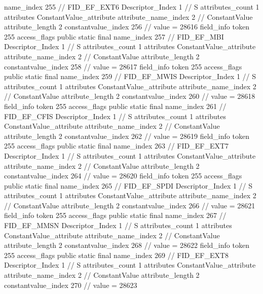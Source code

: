 {{{{{				name_index	255		// FID_EF_EXT6
				Descriptor_Index	1		// S
				attributes_count	1
				attributes {
				ConstantValue_attribute {
					attribute_name_index	2		// ConstantValue
					attribute_length	2
					constantvalue_index	256		// value = 28616
				}
				}
			}
			field_info {
				token	255
				access_flags	public static final
				name_index	257		// FID_EF_MBI
				Descriptor_Index	1		// S
				attributes_count	1
				attributes {
				ConstantValue_attribute {
					attribute_name_index	2		// ConstantValue
					attribute_length	2
					constantvalue_index	258		// value = 28617
				}
				}
			}
			field_info {
				token	255
				access_flags	public static final
				name_index	259		// FID_EF_MWIS
				Descriptor_Index	1		// S
				attributes_count	1
				attributes {
				ConstantValue_attribute {
					attribute_name_index	2		// ConstantValue
					attribute_length	2
					constantvalue_index	260		// value = 28618
				}
				}
			}
			field_info {
				token	255
				access_flags	public static final
				name_index	261		// FID_EF_CFIS
				Descriptor_Index	1		// S
				attributes_count	1
				attributes {
				ConstantValue_attribute {
					attribute_name_index	2		// ConstantValue
					attribute_length	2
					constantvalue_index	262		// value = 28619
				}
				}
			}
			field_info {
				token	255
				access_flags	public static final
				name_index	263		// FID_EF_EXT7
				Descriptor_Index	1		// S
				attributes_count	1
				attributes {
				ConstantValue_attribute {
					attribute_name_index	2		// ConstantValue
					attribute_length	2
					constantvalue_index	264		// value = 28620
				}
				}
			}
			field_info {
				token	255
				access_flags	public static final
				name_index	265		// FID_EF_SPDI
				Descriptor_Index	1		// S
				attributes_count	1
				attributes {
				ConstantValue_attribute {
					attribute_name_index	2		// ConstantValue
					attribute_length	2
					constantvalue_index	266		// value = 28621
				}
				}
			}
			field_info {
				token	255
				access_flags	public static final
				name_index	267		// FID_EF_MMSN
				Descriptor_Index	1		// S
				attributes_count	1
				attributes {
				ConstantValue_attribute {
					attribute_name_index	2		// ConstantValue
					attribute_length	2
					constantvalue_index	268		// value = 28622
				}
				}
			}
			field_info {
				token	255
				access_flags	public static final
				name_index	269		// FID_EF_EXT8
				Descriptor_Index	1		// S
				attributes_count	1
				attributes {
				ConstantValue_attribute {
					attribute_name_index	2		// ConstantValue
					attribute_length	2
					constantvalue_index	270		// value = 28623
				}
}}}}}}
